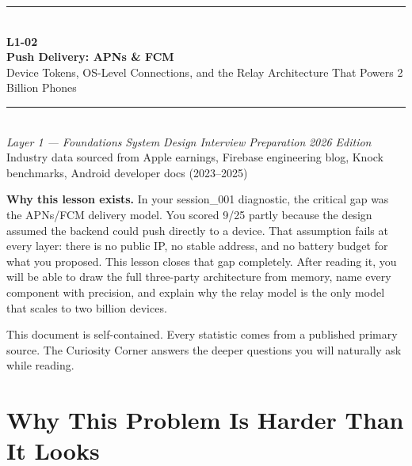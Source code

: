 \documentclass[11pt,a4paper]{article}
\begin{document}
\begin{titlepage}
\vspace*{2cm}
\begin{center}
  {\color{primary}\rule{\linewidth}{3pt}}\\[12pt]
  {\huge\bfseries\color{highlight} L1-02}\\[6pt]
  {\Huge\bfseries\color{primary} Push Delivery: APNs \& FCM}\\[10pt]
  {\large\color{primary!70} Device Tokens, OS-Level Connections, and the Relay Architecture That Powers 2 Billion Phones}\\[20pt]
  {\color{primary}\rule{\linewidth}{1pt}}\\[16pt]
  {\normalsize\color{primary!70}
    \textit{Layer 1 --- Foundations} \quad\textbullet\quad
    \textit{System Design Interview Preparation} \quad\textbullet\quad
    \textit{2026 Edition}
  }\\[8pt]
  {\small\color{primary!60} Industry data sourced from Apple earnings, Firebase engineering blog, Knock benchmarks, Android developer docs (2023--2025)}
\end{center}
\vfill
\begin{insightbox}
\textbf{Why this lesson exists.} In your session\_001 diagnostic, the critical gap was the APNs/FCM delivery model. You scored 9/25 partly because the design assumed the backend could push directly to a device. That assumption fails at every layer: there is no public IP, no stable address, and no battery budget for what you proposed. This lesson closes that gap completely. After reading it, you will be able to draw the full three-party architecture from memory, name every component with precision, and explain why the relay model is the only model that scales to two billion devices.

This document is self-contained. Every statistic comes from a published primary source. The Curiosity Corner answers the deeper questions you will naturally ask while reading.
\end{insightbox}
\vspace{1cm}
\tableofcontents
\end{titlepage}

\section{Why This Problem Is Harder Than It Looks}
\end{document}
